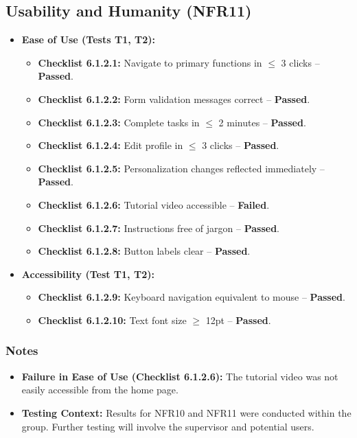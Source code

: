 \documentclass[12pt, titlepage]{article}
\begin{document}
\subsection{Usability and Humanity (NFR11)}  
\label{nfr11}

\begin{itemize}
    \item \textbf{Ease of Use (Tests T1, T2):}  
    \begin{itemize}
        \item \textbf{Checklist 6.1.2.1:} Navigate to primary functions in $\le$ 3 clicks – \textbf{Passed}.  
        \item \textbf{Checklist 6.1.2.2:} Form validation messages correct – \textbf{Passed}.  
        \item \textbf{Checklist 6.1.2.3:} Complete tasks in $\le$ 2 minutes – \textbf{Passed}.  
        \item \textbf{Checklist 6.1.2.4:} Edit profile in $\le$ 3 clicks – \textbf{Passed}.  
        \item \textbf{Checklist 6.1.2.5:} Personalization changes reflected immediately – \textbf{Passed}.  
        \item \textbf{Checklist 6.1.2.6:} Tutorial video accessible – \textbf{Failed}.  
        \item \textbf{Checklist 6.1.2.7:} Instructions free of jargon – \textbf{Passed}.  
        \item \textbf{Checklist 6.1.2.8:} Button labels clear – \textbf{Passed}.  
    \end{itemize}
    
    \item \textbf{Accessibility (Test T1, T2):}  
    \begin{itemize}
        \item \textbf{Checklist 6.1.2.9:} Keyboard navigation equivalent to mouse – \textbf{Passed}.  
        \item \textbf{Checklist 6.1.2.10:} Text font size $\ge$ 12pt – \textbf{Passed}.  
    \end{itemize}
\end{itemize}

\subsubsection*{Notes}  
\begin{itemize}
    \item \textbf{Failure in Ease of Use (Checklist 6.1.2.6):} The tutorial video was not easily accessible from the home page.  
    \item \textbf{Testing Context:} Results for NFR10 and NFR11 were conducted within the group. Further testing will involve the supervisor and potential users.  
\end{itemize}
\end{document}
